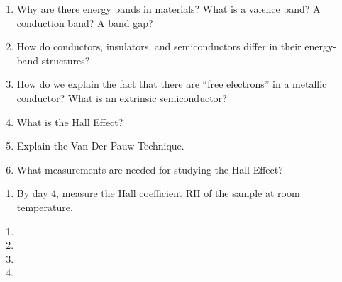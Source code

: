\documentclass{../signatures}
\begin{document}
\maketitle

\names

\prelab

\begin{enumerate}

    \item Why are there energy bands in materials? What is a valence band? A conduction band? A band gap?
    
    \item How do conductors, insulators, and semiconductors differ in their energy-band structures?

    \item How do we explain the fact that there are “free electrons” in a metallic conductor? What is an extrinsic semiconductor?

    \item What is the Hall Effect?
    
    \item Explain the Van Der Pauw Technique.
    
    \item What measurements are needed for studying the Hall Effect?
    \\[36pt]
\end{enumerate}

\prelabsignatures

\midlab

\begin{enumerate}

    \item By day 4, measure the Hall coefficient RH of the sample at room temperature.
\\[36pt]
\end{enumerate}

\newpage
\checkpointsection 
\begin{enumerate}

\item {}

\item {}

\item {}

\item {}

\end{enumerate}
\end{document}
